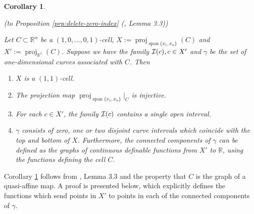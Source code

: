 \documentclass[
]{book}
\newtheorem{corollary}{Corollary}[chapter]
\theoremstyle{definition}
\theoremstyle{definition}
\theoremstyle{definition}
\theoremstyle{definition}
\theoremstyle{remark}
\begin{document}
\begin{corollary}
\protect\hypertarget{cor:gamma-top-bottom}{}\label{cor:gamma-top-bottom}

(to Proposition \ref{prp:delete-zero-index} (\citet{bgv15}, Lemma 3.3))

Let \(C\subset \mathbb{R}^\alpha\) be a \((1,0,\ldots,0,1)\)-cell, \(X := {\operatorname{proj}_{{\operatorname{span} \{x_1,x_\alpha\}}}} (C)\) and \(X' := {\operatorname{proj}_{\mathbb{R}^{1}}}(C)\). Suppose we have the family \({\cal I}(c), c \in X'\) and \(\gamma\) be the set of one-dimensional curves associated with \(C\).
Then

\begin{enumerate}
\def\labelenumi{\arabic{enumi}.}
\item
  \(X\) is a \((1,1)\)-cell.
\item
  The projection map \({\operatorname{proj}_{{\operatorname{span} \{x_1,x_\alpha\}}}}\vert_C\) is injective.
\item
  For each \(c \in X'\), the family \({\cal I}(c)\) contains a single open interval.
\item
  \(\gamma\) consists of zero, one or two disjoint curve intervals which coincide with the top and bottom of \(X\). Furthermore, the connected components of \(\gamma\) can be defined as the graphs of continuous definable functions from \(X'\) to \(\mathbb{R}\), using the functions defining the cell \(C\).
\end{enumerate}

\end{corollary}

Corollary \ref{cor:gamma-top-bottom} follows from \citet{bgv15}, Lemma 3.3 and the property that \(C\) is the graph of a quasi-affine map.
A proof is presented below, which explicitly defines the functions which send points in \(X'\) to points in each of the connected components of \(\gamma\).
\end{document}

